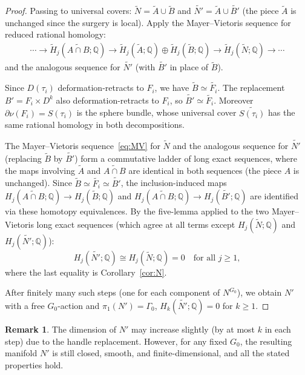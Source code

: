 \documentclass[12pt]{article}
\theoremstyle{definition}
\newtheorem{remark}[theorem]{Remark}
\theoremstyle{remark}
\begin{document}
\begin{proof}
Passing to universal covers: $\widetilde{N} = \widetilde{A} \cup \widetilde{B}$ and
$\widetilde{N'} = \widetilde{A} \cup \widetilde{B'}$ (the piece $\widetilde{A}$
is unchanged since the surgery is local). Apply the Mayer--Vietoris sequence for
reduced rational homology:
\begin{align}
  \label{eq:MV}
  \cdots \to \widetilde{H}_j(\widetilde{A\cap B};\mathbb{Q}) \to
  \widetilde{H}_j(\widetilde{A};\mathbb{Q}) \oplus \widetilde{H}_j(\widetilde{B};\mathbb{Q}) \to
  \widetilde{H}_j(\widetilde{N};\mathbb{Q}) \to \cdots
\end{align}
and the analogous sequence for $\widetilde{N'}$ (with $\widetilde{B'}$ in place of $\widetilde{B}$).

Since $D(\tau_i)$ deformation-retracts to $F_i$, we have $\widetilde{B} \simeq \widetilde{F_i}$.
The replacement $B' = F_i \times D^k$ also deformation-retracts to $F_i$, so
$\widetilde{B'} \simeq \widetilde{F_i}$. Moreover $\partial\nu(F_i) = S(\tau_i)$
is the sphere bundle, whose universal cover $\widetilde{S(\tau_i)}$ has the same
rational homology in both decompositions.

The Mayer--Vietoris sequence~\eqref{eq:MV} for $\widetilde{N}$ and the analogous
sequence for $\widetilde{N'}$ (replacing $\widetilde{B}$ by $\widetilde{B'}$) form
a commutative ladder of long exact sequences, where the maps involving $\widetilde{A}$
and $\widetilde{A\cap B}$ are identical in both sequences (the piece $A$ is unchanged).
Since $\widetilde{B} \simeq \widetilde{F_i} \simeq \widetilde{B'}$, the inclusion-induced
maps $H_j(\widetilde{A\cap B};\mathbb{Q}) \to H_j(\widetilde{B};\mathbb{Q})$ and
$H_j(\widetilde{A\cap B};\mathbb{Q}) \to H_j(\widetilde{B'};\mathbb{Q})$ are identified
via these homotopy equivalences. By the five-lemma applied to the two Mayer--Vietoris
long exact sequences (which agree at all terms except $H_j(\widetilde{N};\mathbb{Q})$
and $H_j(\widetilde{N'};\mathbb{Q})$):
\[
  H_j(\widetilde{N'};\mathbb{Q}) \cong H_j(\widetilde{N};\mathbb{Q}) = 0
  \quad \text{for all } j \geq 1,
\]
where the last equality is Corollary~\ref{cor:N}.

After finitely many such steps (one for each component of $N^{G_0}$), we obtain
$N'$ with a free $G_0$-action and $\pi_1(N') = \Gamma_0$, $H_k(\widetilde{N'};\mathbb{Q}) = 0$
for $k \geq 1$.
\end{proof}

\begin{remark}
\label{rem:dim}
The dimension of $N'$ may increase slightly (by at most $k$ in each step) due to the
handle replacement. However, for any fixed $G_0$, the resulting manifold $N'$ is still
closed, smooth, and finite-dimensional, and all the stated properties hold.
\end{remark}
\end{document}
